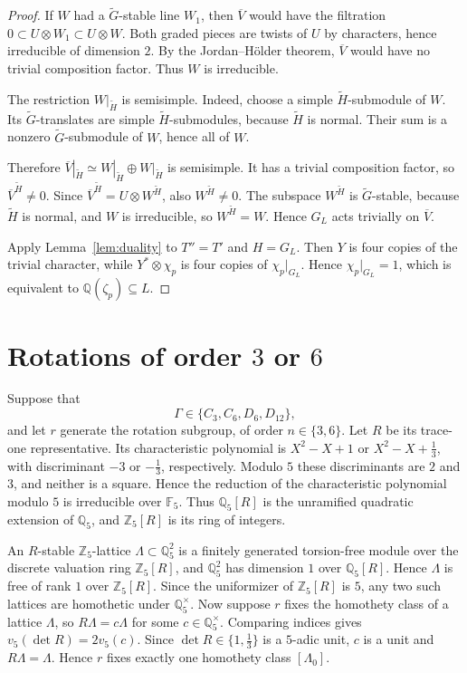 \documentclass[11pt]{article}
\newcommand{\Q}{\mathbb Q}
\newcommand{\Z}{\mathbb Z}
\newcommand{\F}{\mathbb F}
\begin{document}
\begin{proof}
If \(W\) had a \(\widetilde G\)-stable line \(W_1\), then
\(\overline V\) would have the filtration
\(0\subset U\otimes W_1\subset U\otimes W\). Both graded pieces are
twists of \(U\) by characters, hence irreducible of dimension \(2\).
By the Jordan--H\"older theorem, \(\overline V\) would have no trivial
composition factor. Thus \(W\) is irreducible.

The restriction \(W|_{\widetilde H}\) is semisimple. Indeed, choose a
simple \(\widetilde H\)-submodule of \(W\). Its
\(\widetilde G\)-translates are simple \(\widetilde H\)-submodules,
because \(\widetilde H\) is normal. Their sum is a nonzero
\(\widetilde G\)-submodule of \(W\), hence all of \(W\).

Therefore \(\overline V|_{\widetilde H}\simeq W|_{\widetilde H}\oplus
W|_{\widetilde H}\) is semisimple. It has a trivial composition factor,
so \(\overline V^{\widetilde H}\neq0\). Since
\(\overline V^{\widetilde H}=U\otimes W^{\widetilde H}\), also
\(W^{\widetilde H}\neq0\). The subspace \(W^{\widetilde H}\) is
\(\widetilde G\)-stable, because \(\widetilde H\) is normal, and \(W\)
is irreducible, so \(W^{\widetilde H}=W\). Hence \(G_L\) acts trivially
on \(\overline V\).

Apply Lemma~\ref{lem:duality} to \(T''=T'\) and \(H=G_L\). Then \(Y\)
is four copies of the trivial character, while \(Y^*\otimes\chi_p\)
is four copies of \(\chi_p|_{G_L}\). Hence \(\chi_p|_{G_L}=1\), which
is equivalent to \(\Q(\zeta_p)\subseteq L\).
\end{proof}

\section{Rotations of order \(3\) or \(6\)}\label{sec:rotations}

Suppose that
\[
 \Gamma\in\{C_3,C_6,D_6,D_{12}\},
\]
and let \(r\) generate the rotation subgroup, of order
\(n\in\{3,6\}\). Let \(R\) be its trace-one representative. Its
characteristic polynomial is \(X^2-X+1\) or \(X^2-X+\frac13\), with
discriminant \(-3\) or \(-\frac13\), respectively. Modulo \(5\) these
discriminants are \(2\) and \(3\), and neither is a square. Hence the
reduction of the characteristic polynomial modulo \(5\) is irreducible
over \(\F_5\). Thus \(\Q_5[R]\) is the unramified quadratic extension
of \(\Q_5\), and \(\Z_5[R]\) is its ring of integers.

An \(R\)-stable \(\Z_5\)-lattice \(\Lambda\subset\Q_5^2\) is a finitely
generated torsion-free module over the discrete valuation ring
\(\Z_5[R]\), and \(\Q_5^2\) has dimension \(1\) over \(\Q_5[R]\).
Hence \(\Lambda\) is free of rank \(1\) over \(\Z_5[R]\). Since the
uniformizer of \(\Z_5[R]\) is \(5\), any two such lattices are
homothetic under \(\Q_5^\times\). Now suppose \(r\) fixes the
homothety class of a lattice \(\Lambda\), so \(R\Lambda=c\Lambda\) for
some \(c\in\Q_5^\times\). Comparing indices gives
\(v_5(\det R)=2v_5(c)\). Since \(\det R\in\{1,\frac13\}\) is a
\(5\)-adic unit, \(c\) is a unit and \(R\Lambda=\Lambda\). Hence \(r\)
fixes exactly one homothety class \([\Lambda_0]\).
\end{document}
